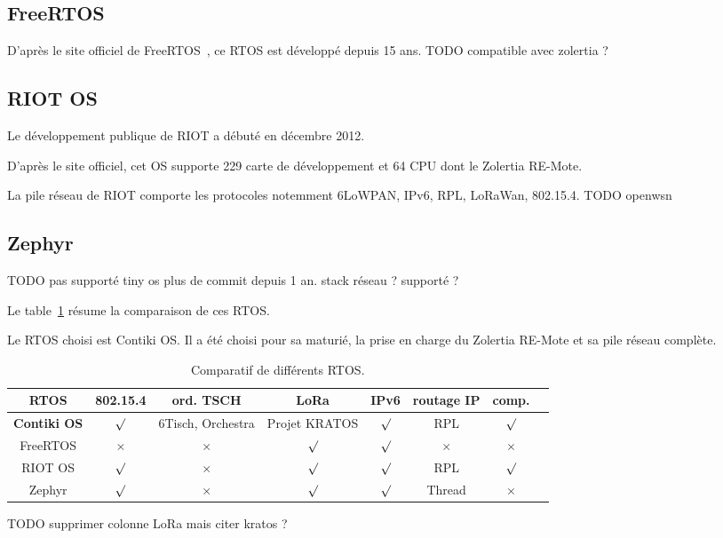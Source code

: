 \subsection*{FreeRTOS}
    D'après le site officiel de FreeRTOS~\cite{freertos}, ce RTOS est développé depuis 15 ans.
    TODO compatible avec zolertia ?

\subsection*{RIOT OS}
    Le développement publique de RIOT a débuté en décembre 2012\footnotemark[1].
    
    D'après le site officiel, cet OS supporte 229 carte de développement et 64 CPU dont le Zolertia RE-Mote. 

    La pile réseau de RIOT comporte les protocoles notemment 6LoWPAN, IPv6, RPL, LoRaWan, 802.15.4.
    TODO openwsn

\subsection*{Zephyr}
    TODO pas supporté 
    tiny os plus de commit depuis 1 an. stack réseau ? supporté ?

Le table~\ref{tb:state-rtos-choice} résume la comparaison de ces RTOS.

Le RTOS choisi est Contiki OS. Il a été choisi pour sa maturié, la prise en charge du Zolertia RE-Mote et sa pile réseau complète.


\begin{table}[H]
    \begin{adjustbox}{width=\textwidth}
        \begin{tabular}{c||c|c|c|c|c|c|c}
            RTOS & 802.15.4 & ord. TSCH & LoRa & IPv6 & routage IP & comp. \\ \hline

            \textbf{Contiki OS} & $\surd$  & 6Tisch, Orchestra & Projet KRATOS & $\surd$ & RPL        & $\surd$ \\ \hline

            FreeRTOS            & $\times$ & $\times$          & $\surd$       & $\surd$ & $\times$   &    $\times$     \\ \hline

            RIOT OS             & $\surd$  & $\times$          & $\surd$       & $\surd$ & RPL        &    $\surd$     \\ \hline

            Zephyr              & $\surd$  & $\times$          & $\surd$       & $\surd$ & Thread     &    $\times$     \\
        \end{tabular}
    \end{adjustbox}
    \caption{Comparatif de différents RTOS.}
    \label{tb:state-rtos-choice}
\end{table}
TODO supprimer colonne LoRa mais citer kratos ? 